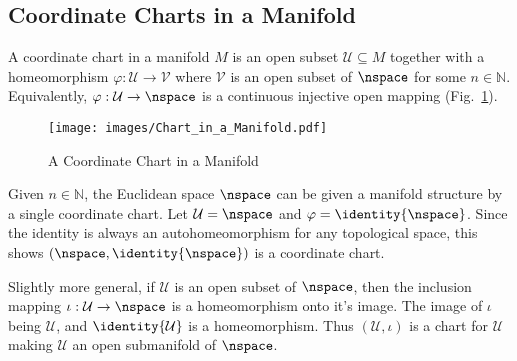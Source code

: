 \documentclass{book}                                                            %
\begin{document}
            \subsection{Coordinate Charts in a Manifold}
                A coordinate chart in a manifold $M$ is an open subset
                $\mathcal{U}\subseteq{M}$ together with a homeomorphism
                $\varphi:\mathcal{U}\rightarrow\mathcal{V}$ where $\mathcal{V}$
                is an open subset of $\nspace$ for some $n\in\mathbb{N}$.
                Equivalently, $\varphi:\mathcal{U}\rightarrow\nspace$ is a
                continuous injective open mapping
                (Fig.~\ref{fig:Coordinate_Chart}).
                \begin{figure}[H]
                    \centering
                    \captionsetup{type=figure}
                    \texttt{[image: images/Chart\_in\_a\_Manifold.pdf]}
                    \caption{A Coordinate Chart in a Manifold}
                    \label{fig:Coordinate_Chart}
                \end{figure}
                \begin{example}
                    Given $n\in\mathbb{N}$, the Euclidean space $\nspace$ can be
                    given a manifold structure by a single coordinate chart. Let
                    $\mathcal{U}=\nspace$ and $\varphi=\identity{\nspace}$.
                    Since the identity is always an autohomeomorphism for any
                    topological space, this shows $(\nspace,\identity{\nspace})$
                    is a coordinate chart.
                \end{example}
                \begin{example}
                    Slightly more general, if $\mathcal{U}$ is an open subset of
                    $\nspace$, then the inclusion mapping
                    $\iota:\mathcal{U}\rightarrow\nspace$ is a homeomorphism
                    onto it's image. The image of $\iota$ being $\mathcal{U}$,
                    and $\identity{\mathcal{U}}$ is a homeomorphism. Thus
                    $(\mathcal{U},\iota)$ is a chart for $\mathcal{U}$ making
                    $\mathcal{U}$ an open submanifold of $\nspace$.
                \end{example}
\end{document}
